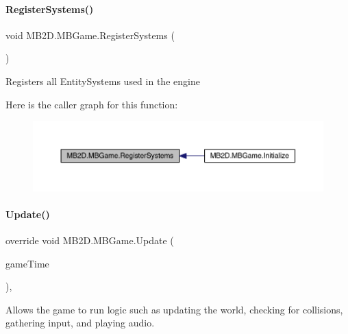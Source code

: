\paragraph{\texorpdfstring{Register\+Systems()}{RegisterSystems()}}
{\footnotesize\ttfamily void M\+B2\+D.\+M\+B\+Game.\+Register\+Systems (\begin{DoxyParamCaption}{ }\end{DoxyParamCaption})\hspace{0.3cm}{\ttfamily [inline]}}



Registers all Entity\+Systems used in the engine 

Here is the caller graph for this function\+:
\nopagebreak
\begin{figure}[H]
\begin{center}
\leavevmode
\includegraphics[width=350pt]{class_m_b2_d_1_1_m_b_game_ad7e9a60dbaefe1416db0456b07b13487_icgraph}
\end{center}
\end{figure}
\hypertarget{class_m_b2_d_1_1_m_b_game_a82968a66f75f9c437074ce7bfd468455}{}\label{class_m_b2_d_1_1_m_b_game_a82968a66f75f9c437074ce7bfd468455} 
\paragraph{\texorpdfstring{Update()}{Update()}}
{\footnotesize\ttfamily override void M\+B2\+D.\+M\+B\+Game.\+Update (\begin{DoxyParamCaption}\item[{Game\+Time}]{game\+Time }\end{DoxyParamCaption})\hspace{0.3cm}{\ttfamily [inline]}, {\ttfamily [protected]}}



Allows the game to run logic such as updating the world, checking for collisions, gathering input, and playing audio. 


